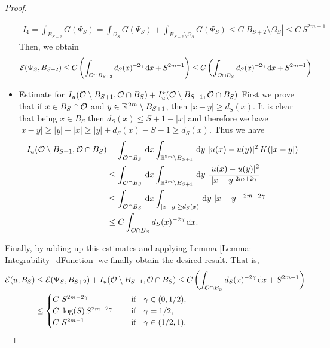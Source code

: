 \begin{proof}
\begin{itemize}
\begin{align*}
I_4 = \int_{B_{S+2}} G(\Psi_S) = \int_{\Omega_S} G(\Psi_S) + \int_{B_{S+2}\setminus \Omega_S} G(\Psi_S) \leq C |B_{S+2}\setminus \Omega_S| \leq C\,S^{2m-1}
\end{align*}
Then, we obtain
\begin{align*}
\mathcal{E}(\Psi_S,B_{S+2}) &\leq C \left(\int_{\mathcal{O} \cap B_{S+2}} d_S(x)^{-2\gamma} \,\mathrm{d} x + S^{2m-1} \right)\leq C\left(\int_{\mathcal{O} \cap B_{S}} d_S(x)^{-2\gamma} \,\mathrm{d} x + S^{2m-1} \right)
\end{align*}
\item Estimate for $I_u(\mathcal{O} \setminus B_{S+1}, \mathcal{O} \cap B_S) + I_u^\star(\mathcal{O} \setminus B_{S+1}, \mathcal{O} \cap B_S)$
First we prove that if $x\in B_S\cap \mathcal{O}$ and $y\in \mathbb{R}^{2m}\setminus B_{S+1}$, then $|x-y|\geq d_S(x)$. It is clear that being $x\in B_S$ then $d_S(x) \leq S+1-|x|$ and therefore we have $|x-y|\geq |y|-|x|\geq |y|+d_S(x)-S-1 \geq  d_S(x)$. Thus we have
\begin{align*}
I_u(\ocal \setminus B_{S+1}, \ocal \cap B_S) &= \int_{\ocal\cap B_S} \d x \int_{\R^{2m}\setminus B_{S+1}} \d y \ |u(x)-u(y)|^2 \, K(|x-y|) \\
&\leq \int_{\ocal\cap B_S} \d x \int_{\R^{2m}\setminus B_{S+1}} \d y \ \frac{|u(x)-u(y)|^2}{|x-y|^{2m+2\s}} \\
&\leq \int_{\ocal\cap B_S} \d x \int_{|x-y|\geq d_S(x)} \d y \ |x-y|^{-2m-2\s} \\
&\leq C \int_{\ocal \cap B_{S}} d_S(x)^{-2\s} \d x.
\end{align*}
\end{itemize}
Finally, by adding up this estimates and applying Lemma \ref{Lemma: Integrability_dFunction} we finally obtain the desired result. That is,
\begin{align*}
\mathcal{E}(u,B_S) &\leq \mathcal{E}(\Psi_S,B_{S+2}) + I_u(\mathcal{O} \setminus B_{S+1}, \mathcal{O} \cap B_S) \leq C\left(\int_{\mathcal{O} \cap B_{S}} d_S(x)^{-2\gamma} \,\mathrm{d} x + S^{2m-1} \right)\\
&\leq \begin{cases}
C \ S^{2m-2\gamma}\ \ \ &\textrm{if } \ \ \gamma\in(0,1/2),\\
C\ \log(S)\,S^{2m-2\gamma}\ \ \ \ &\textrm{if } \ \ \gamma=1/2,\\
C \ S^{2m-1}\ \ \ \ &\textrm{if } \ \ \gamma\in(1/2,1).\\
\end{cases}
\end{align*}

\end{proof}
